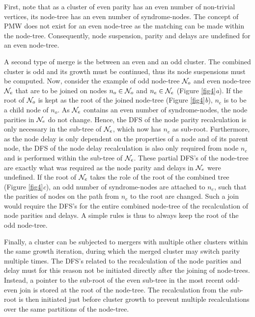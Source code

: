 First, note that as a cluster of even parity has an even number of non-trivial vertices, its node-tree has an even number of syndrome-nodes. The concept of PMW does not exist for an even node-tree as the matching can be made within the node-tree. Consequently, node suspension, parity and delays are undefined for an even node-tree. 

A second type of merge is the between an even and an odd cluster. The combined cluster is odd and its growth must be continued, thus its node suspensions must be computed. Now, consider the example of odd node-tree $\mathcal{N}_o$ and even node-tree $\mathcal{N}_e$ that are to be joined on nodes $n_o\in \mathcal{N}_o$ and $n_e \in \mathcal{N}_e$ (Figure \ref{fig4}\emph{a}). If the root of $\mathcal{N}_o$ is kept as the root of the joined node-tree (Figure \ref{fig4}\emph{b}), $n_e$ is to be a child node of $n_o$. As $\mathcal{N}_e$ contains an even number of syndrome-nodes, the node parities in $\mathcal{N}_e$ do not change. Hence, the DFS of the node parity recalculation is only necessary in the sub-tree of $\mathcal{N}_e$, which now has $n_e$ as sub-root. Furthermore, as the node delay is only dependent on the properties of a node and of its parent node, the DFS of the node delay recalculation is also only required from node $n_e$ and is performed within the sub-tree of $\mathcal{N}_e$. These partial DFS's of the node-tree are exactly what was required as the node parity and delays in $\mathcal{N}_e$ were undefined. If the root of $\mathcal{N}_e$ takes the role of the root of the combined tree (Figure \ref{fig4}\emph{c}), an odd number of syndrome-nodes are attached to $n_e$, such that the parities of nodes on the path from $n_e$ to the root are changed. Such a join would require the DFS's for the entire combined node-tree of the recalculation of node parities and delays. A simple rules is thus to always keep the root of the odd node-tree. 

Finally, a cluster can be subjected to mergers with multiple other clusters within the same growth iteration, during which the merged cluster may switch parity multiple times. The DFS's related to the recalculation of the node parities and delay must for this reason not be initiated directly after the joining of node-trees. Instead, a pointer to the sub-root of the even sub-tree in the most recent odd-even join is stored at the root of the node-tree. The recalculation from the sub-root is then initiated just before cluster growth to prevent multiple recalculations over the same partitions of the node-tree. 


